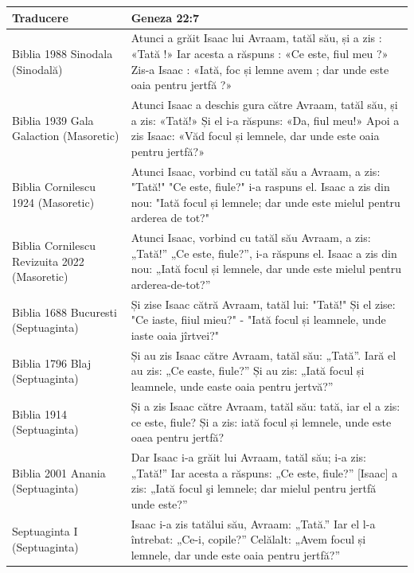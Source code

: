 \documentclass[12pt,a4paper]{article}
\begin{document}
\begin{longtable}{|p{3cm}|L|}
    \hline
    \textbf{Traducere}                           & \textbf{Geneza 22:7}                                                                                                                                                                      \\
    \hline
    Biblia 1988 Sinodala (Sinodală)              & Atunci a grăit Isaac lui Avraam, tatăl său, și a zis : «Tată !» Iar acesta a răspuns : «Ce este, fiul meu ?» Zis-a Isaac : «Iată, foc și lemne avem ; dar unde este oaia pentru jertfă ?» \\
    \hline
    Biblia 1939 Gala Galaction (Masoretic)       & Atunci Isaac a deschis gura către Avraam, tatăl său, și a zis: «Tată!» Și el i-a răspuns: «Da, fiul meu!» Apoi a zis Isaac: «Văd focul și lemnele, dar unde este oaia pentru jertfă?»     \\
    \hline
    Biblia Cornilescu 1924 (Masoretic)           & Atunci Isaac, vorbind cu tatăl său a Avraam, a zis: "Tată!" "Ce este, fiule?" i-a raspuns el. Isaac a zis din nou: "Iată focul și lemnele; dar unde este mielul pentru arderea de tot?"   \\
    \hline
    Biblia Cornilescu Revizuita 2022 (Masoretic) & Atunci Isaac, vorbind cu tatăl său Avraam, a zis: „Tată!” „Ce este, fiule?”, i-a răspuns el. Isaac a zis din nou: „Iată focul și lemnele, dar unde este mielul pentru arderea-de-tot?”    \\
    \hline
    Biblia 1688 Bucuresti (Septuaginta)          & Și zise Isaac cătră Avraam, tatăl lui: "Tată!" Și el zise: "Ce iaste, fiiul mieu?" - "Iată focul și leamnele, unde iaste oaia jîrtvei?"                                                   \\
    \hline
    Biblia 1796 Blaj (Septuaginta)               & Și au zis Isaac către Avraam, tatăl său: „Tată”. Iară el au zis: „Ce easte, fiule?” Și au zis: „Iată focul și leamnele, unde easte oaia pentru jertvă?”                                   \\
    \hline
    Biblia 1914 (Septuaginta)                    & Și a zis Isaac către Avraam, tatăl său: tată, iar el a zis: ce este, fiule? Și a zis: iată focul și lemnele, unde este oaea pentru jertfă?                                                \\
    \hline
    Biblia 2001 Anania (Septuaginta)             & Dar Isaac i-a grăit lui Avraam, tatăl său; i-a zis: „Tată!” Iar acesta a răspuns: „Ce este, fiule?” [Isaac] a zis: „Iată focul şi lemnele; dar mielul pentru jertfă unde este?”           \\
    \hline
    Septuaginta I (Septuaginta)                  & Isaac i-a zis tatălui său, Avraam: „Tată.” Iar el l-a întrebat: „Ce-i, copile?” Celălalt: „Avem focul și lemnele, dar unde este oaia pentru jertfă?”                                      \\
    \hline
\end{longtable}
\end{document}

